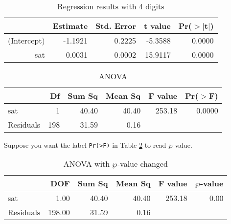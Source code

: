 \documentclass[11pt]{article}\usepackage[]{graphicx}\usepackage[]{color}
\begin{document}
\begin{table}[ht]
\centering
\begin{tabular}{rrrrr}
  \hline
 & Estimate & Std. Error & t value & Pr($>$$|$t$|$) \\ 
  \hline
(Intercept) & -1.1921 & 0.2225 & -5.3588 & 0.0000 \\ 
  sat & 0.0031 & 0.0002 & 15.9117 & 0.0000 \\ 
   \hline
\end{tabular}
\caption{Regression results with 4 digits} 
\label{RR2}
\end{table}


\begin{table}[ht]
\centering
\begin{tabular}{lrrrrr}
  \hline
 & Df & Sum Sq & Mean Sq & F value & Pr($>$F) \\ 
  \hline
sat & 1 & 40.40 & 40.40 & 253.18 & 0.0000 \\ 
  Residuals & 198 & 31.59 & 0.16 &  &  \\ 
   \hline
\end{tabular}
\caption{ANOVA} 
\label{AR}
\end{table}


Suppose you want the label \texttt{Pr(>F)} in Table \ref{AR} to read $\wp$-value.

\begin{table}[ht]
\centering
\begin{tabular}{lrrrrr}
  \hline
 & DOF & Sum Sq & Mean Sq & F value & $\wp$-value \\ 
  \hline
sat & 1.00 & 40.40 & 40.40 & 253.18 & 0.00 \\ 
  Residuals & 198.00 & 31.59 & 0.16 &  &  \\ 
   \hline
\end{tabular}
\caption{ANOVA with $\wp$-value changed} 
\label{ARpvalue}
\end{table}
\end{document}
